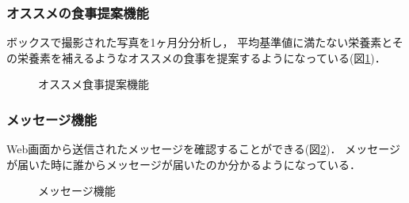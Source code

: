 \documentclass[../report]{subfiles}
\begin{document}
\subsubsection{オススメの食事提案機能}
ボックスで撮影された写真を1ヶ月分分析し， 平均基準値に満たない栄養素とその栄養素を補えるようなオススメの食事を提案するようになっている(図\ref{fig:5_tv-suggestion})．

\begin{figure}[htbp]
    \begin{center}
        \caption{オススメ食事提案機能}
        \label{fig:5_tv-suggestion}
    \end{center}
\end{figure}

\subsubsection{メッセージ機能}
Web画面から送信されたメッセージを確認することができる(図\ref{fig:5_tv-message})．
メッセージが届いた時に誰からメッセージが届いたのか分かるようになっている．

\begin{figure}[htbp]
    \begin{center}
        \caption{メッセージ機能}
        \label{fig:5_tv-message}
    \end{center}
\end{figure}
\end{document}
